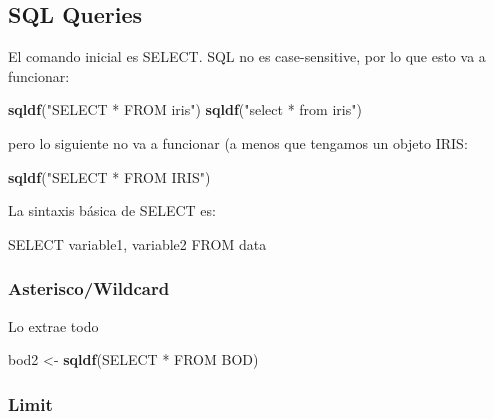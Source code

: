 \documentclass[
]{book}
\newenvironment{Shaded}{\begin{snugshade}}{\end{snugshade}}
\newcommand{\FunctionTok}[1]{\textcolor[rgb]{0.13,0.29,0.53}{\textbf{#1}}}
\newcommand{\NormalTok}[1]{#1}
\newcommand{\OtherTok}[1]{\textcolor[rgb]{0.56,0.35,0.01}{#1}}
\newcommand{\StringTok}[1]{\textcolor[rgb]{0.31,0.60,0.02}{#1}}
\theoremstyle{break}
\theoremstyle{nonumberplain}
\begin{document}
\subsection{SQL Queries}\label{sql-queries}

El comando inicial es SELECT. SQL no es case-sensitive, por lo que esto va a funcionar:

\begin{Shaded}
\begin{Highlighting}[]
\FunctionTok{sqldf}\NormalTok{(}\StringTok{"SELECT * FROM iris"}\NormalTok{)}
\FunctionTok{sqldf}\NormalTok{(}\StringTok{"select * from iris"}\NormalTok{)}
\end{Highlighting}
\end{Shaded}

pero lo siguiente no va a funcionar (a menos que tengamos un objeto IRIS:

\begin{Shaded}
\begin{Highlighting}[]
\FunctionTok{sqldf}\NormalTok{(}\StringTok{"SELECT * FROM IRIS"}\NormalTok{)}
\end{Highlighting}
\end{Shaded}

La sintaxis básica de SELECT es:

\begin{Shaded}
\begin{Highlighting}[]
\NormalTok{SELECT variable1, variable2 FROM data}
\end{Highlighting}
\end{Shaded}

\subsubsection{Asterisco/Wildcard}\label{asteriscowildcard}

Lo extrae todo

\begin{Shaded}
\begin{Highlighting}[]
\NormalTok{bod2 }\OtherTok{\textless{}{-}} \FunctionTok{sqldf}\NormalTok{(}\StringTok{\textquotesingle{}SELECT * FROM BOD\textquotesingle{}}\NormalTok{)}
\end{Highlighting}
\end{Shaded}

\subsubsection{Limit}\label{limit}
\end{document}
